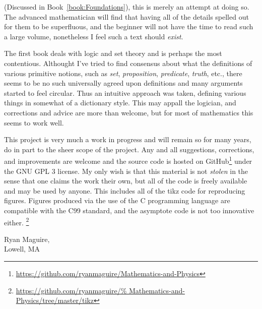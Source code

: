 (Discussed in Book~\ref{book:Foundations}), this is merely an attempt at doing
so. The advanced mathematician will find that having all of the details spelled
out for them to be superfluous, and the beginner will not have the time to read
such a large volume, nonetheless I feel such a text should \textit{exist}. 
\par\hfill\par
The first book deals with logic and set theory and is perhaps the most
contentious. Althought I've tried to find consensus about what the definitions
of various primitive notions, such as \textit{set}, \textit{proposition},
\textit{predicate}, \textit{truth}, etc., there seems to be no such universally
agreed upon definitions and many arguments started to feel circular. Thus an
intuitive approach was taken, defining various things in somewhat of a
dictionary style. This may appall the logician, and corrections and advice are
more than welcome, but for most of mathematics this seems to work well.
\par\hfill\par
This project is very much a work in progress and will remain so for many years,
do in part to the sheer scope of the project. Any and all suggestions,
corrections, and improvements are welcome and the source code is hosted on
GitHub\footnote{\url{https://github.com/ryanmaguire/Mathematics-and-Physics}}
under the GNU GPL 3 license. My only wish is that this material is not
\textit{stolen} in the sense that one claims the work their own, but all of the
code is freely available and may be used by anyone. This includes all of the
tikz code for reproducing figures. Figures produced via the use of the C
programming language are compatible with the C99 standard, and the asymptote
code is not too innovative either.%
\footnote{\url{https://github.com/ryanmaguire/%
               Mathematics-and-Physics/tree/master/tikz}}
\begin{flushright}
    Ryan Maguire,\\
    Lowell, MA\\
\end{flushright}